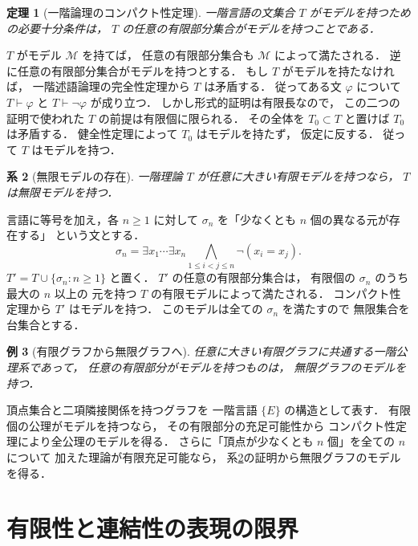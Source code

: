 \documentclass[a5paper,10pt,onecolumn]{jsarticle}
\makeatletter
\theoremstyle{mathnotetheorem}
\newtheorem{theorem}{定理}[section]
\newtheorem{corollary}[theorem]{系}
\newtheorem{example}[theorem]{例}
\renewcommand{\proofname}{証明}
\renewenvironment{proof}[1][\proofname]{%
  \par\pushQED{\qed}\normalfont\topsep4\p@\@plus2\p@\relax
  \trivlist\item[\hskip\labelsep\bfseries #1]\ignorespaces
}{\popQED\endtrivlist\@endpefalse}
\makeatother
\begin{document}
\begin{theorem}[一階論理のコンパクト性定理]\label{thm:compactness}
一階言語の文集合 $T$ がモデルを持つための必要十分条件は，
$T$ の任意の有限部分集合がモデルを持つことである．
\end{theorem}
\begin{proof}
$T$ がモデル $\mathcal M$ を持てば，
任意の有限部分集合も $\mathcal M$ によって満たされる．
逆に任意の有限部分集合がモデルを持つとする．
もし $T$ がモデルを持たなければ，
一階述語論理の完全性定理から $T$ は矛盾する．
従ってある文 $\varphi$ について
$T\vdash\varphi$ と $T\vdash\neg\varphi$ が成り立つ．
しかし形式的証明は有限長なので，
この二つの証明で使われた $T$ の前提は有限個に限られる．
その全体を $T_0\subset T$ と置けば
$T_0$ は矛盾する．
健全性定理によって $T_0$ はモデルを持たず，
仮定に反する．
従って $T$ はモデルを持つ．
\end{proof}

\begin{corollary}[無限モデルの存在]\label{cor:infinite}
一階理論 $T$ が任意に大きい有限モデルを持つなら，
$T$ は無限モデルを持つ．
\end{corollary}
\begin{proof}
言語に等号を加え，各 $n\ge1$ に対して
$\sigma_n$ を「少なくとも $n$ 個の異なる元が存在する」
という文とする．
\[
 \sigma_n=\exists x_1\cdots\exists x_n
 \bigwedge_{1\le i<j\le n}\neg(x_i=x_j).
\]
$T'=T\cup\{\sigma_n:n\ge1\}$ と置く．
$T'$ の任意の有限部分集合は，
有限個の $\sigma_n$ のうち最大の $n$ 以上の
元を持つ $T$ の有限モデルによって満たされる．
コンパクト性定理から $T'$ はモデルを持つ．
このモデルは全ての $\sigma_n$ を満たすので
無限集合を台集合とする．
\end{proof}

\begin{example}[有限グラフから無限グラフへ]
任意に大きい有限グラフに共通する一階公理系であって，
任意の有限部分がモデルを持つものは，
無限グラフのモデルを持つ．
\end{example}
\begin{proof}
頂点集合と二項隣接関係を持つグラフを
一階言語 $\{E\}$ の構造として表す．
有限個の公理がモデルを持つなら，
その有限部分の充足可能性から
コンパクト性定理により全公理のモデルを得る．
さらに「頂点が少なくとも $n$ 個」を全ての $n$ について
加えた理論が有限充足可能なら，
系\ref{cor:infinite}の証明から無限グラフのモデルを得る．
\end{proof}

\section{有限性と連結性の表現の限界}
\end{document}
